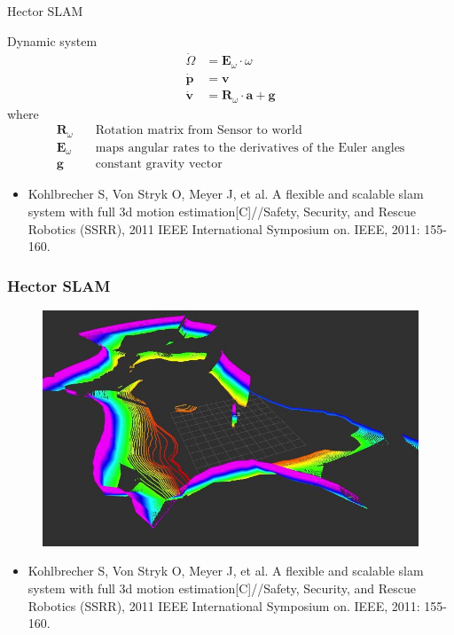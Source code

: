 \documentclass[14pt,hyperref={CJKbookmarks=true}]{beamer}
\theoremstyle{plain}
\theoremstyle{definition}
\theoremstyle{remark}
\begin{document}
\begin{frame}{Hector SLAM}
\begin{block}{Dynamic system}\small
\begin{equation*}
\begin{split}
\dot{\Omega}&=\mathbf{E}_\omega\cdot\omega\\
\dot{\mathbf{p}}&=\mathbf{v}\\
\dot{\mathbf{v}}&=\mathbf{R}_\omega\cdot\mathbf{a}+\mathbf{g}
\end{split}
\end{equation*}
where\scriptsize
\begin{equation*}
\begin{split}
\mathbf{R}_\omega \quad & \text{Rotation matrix from Sensor to world}\\
\mathbf{E}_\omega \quad & \text{maps angular rates to the derivatives of the Euler angles}\\
\mathbf{g} \quad & \text{constant gravity vector}
\end{split}
\end{equation*}
\begin{itemize}\tiny
\item Kohlbrecher S, Von Stryk O, Meyer J, et al. A flexible and scalable slam system with full 3d motion estimation[C]//Safety, Security, and Rescue Robotics (SSRR), 2011 IEEE International Symposium on. IEEE, 2011: 155-160.
\end{itemize}
\end{block}
\end{frame}

\begin{frame}
\frametitle{Hector SLAM}
\begin{figure}
\centering
\includegraphics[width=0.6\linewidth]{hector-slam.jpg}
\end{figure}
\begin{itemize}\tiny
\item Kohlbrecher S, Von Stryk O, Meyer J, et al. A flexible and scalable slam system with full 3d motion estimation[C]//Safety, Security, and Rescue Robotics (SSRR), 2011 IEEE International Symposium on. IEEE, 2011: 155-160.
\end{itemize}
\end{frame}
\end{document}
